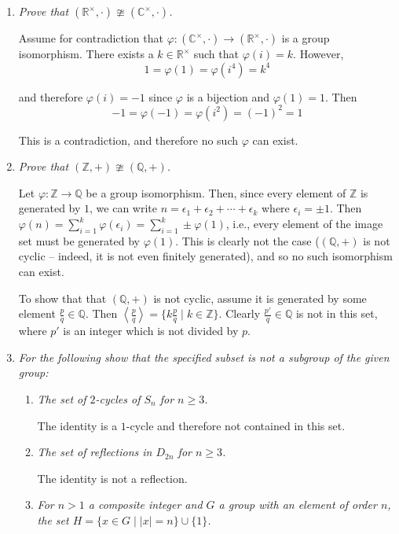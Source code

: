 \documentclass[letterpaper, 11pt]{article}
\begin{document}
\begin{enumerate}
\item \emph{Prove that $(\mathbb{R}^{\times}, \cdot) \ncong (\mathbb{C}^{\times}, \cdot)$.}

Assume for contradiction that $\varphi: (\mathbb{C}^{\times}, \cdot) \rightarrow (\mathbb{R}^{\times}, \cdot)$ is a group isomorphism.  There exists a $k \in \mathbb{R}^{\times}$ such that $\varphi(i) = k$.  However,
\[
1 = \varphi(1) = \varphi(i^4) = k^4
\]

and therefore $\varphi(i) = -1$ since $\varphi$ is a bijection and $\varphi(1) = 1$.  Then
\[
-1 = \varphi(-1) = \varphi(i^2) = (-1)^2 = 1
\]

This is a contradiction, and therefore no such $\varphi$ can exist.

\item \emph{Prove that $(\mathbb{Z}, +) \ncong (\mathbb{Q}, +)$.}

Let $\varphi: \mathbb{Z} \rightarrow \mathbb{Q}$ be a group isomorphism.  Then, since every element of $\mathbb{Z}$ is generated by $1$, we can write $n = \epsilon_1 + \epsilon_2 + \cdots + \epsilon_k$ where $\epsilon_i = \pm  1$.  Then $\varphi(n) = \sum_{i=1}^k \varphi(\epsilon_i) = \sum_{i=1}^k \pm \varphi(1)$, i.e., every element of the image set must be generated by $\varphi(1)$.  This is clearly not the case ($(\mathbb{Q}, +)$ is not cyclic -- indeed, it is not even finitely generated), and so no such isomorphism can exist.

To show that that $(\mathbb{Q}, +)$ is not cyclic, assume it is generated by some element $\frac{p}{q} \in \mathbb{Q}$.  Then $\left< \frac{p}{q} \right> = \{ k \frac{p}{q} \mid k \in \mathbb{Z} \}$.  Clearly $\frac{p'}{q} \in \mathbb{Q}$ is not in this set, where $p'$ is an integer which is not divided by $p$.

\newpage
\item \emph{For the following show that the specified subset is not a subgroup of the given group:}
\begin{enumerate}
\item \emph{The set of $2$-cycles of $S_n$ for $n \geq 3$.}

The identity is a $1$-cycle and therefore not contained in this set.

\item \emph{The set of reflections in $D_{2n}$ for $n \geq 3$.}

The identity is not a reflection.

\item \emph{For $n > 1$ a composite integer and $G$ a group with an element of order $n$, the set $H = \{x \in G \mid |x| = n\} \cup \{1\}$.}


\end{enumerate}
\end{enumerate}
\end{document}
